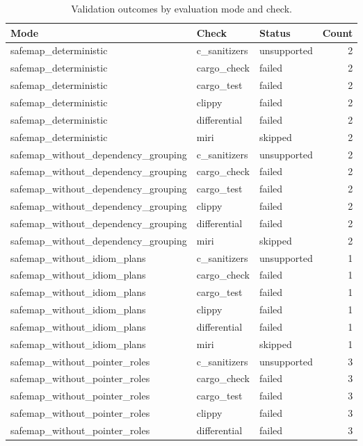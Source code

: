 \begin{table}[t]
\centering
\caption{Validation outcomes by evaluation mode and check.}
\label{tab:safemap-validation-statuses}
\begin{tabular}{lllr}
\hline
Mode & Check & Status & Count \\
\hline
safemap\_deterministic & c\_sanitizers & unsupported & 2 \\
safemap\_deterministic & cargo\_check & failed & 2 \\
safemap\_deterministic & cargo\_test & failed & 2 \\
safemap\_deterministic & clippy & failed & 2 \\
safemap\_deterministic & differential & failed & 2 \\
safemap\_deterministic & miri & skipped & 2 \\
safemap\_without\_dependency\_grouping & c\_sanitizers & unsupported & 2 \\
safemap\_without\_dependency\_grouping & cargo\_check & failed & 2 \\
safemap\_without\_dependency\_grouping & cargo\_test & failed & 2 \\
safemap\_without\_dependency\_grouping & clippy & failed & 2 \\
safemap\_without\_dependency\_grouping & differential & failed & 2 \\
safemap\_without\_dependency\_grouping & miri & skipped & 2 \\
safemap\_without\_idiom\_plans & c\_sanitizers & unsupported & 1 \\
safemap\_without\_idiom\_plans & cargo\_check & failed & 1 \\
safemap\_without\_idiom\_plans & cargo\_test & failed & 1 \\
safemap\_without\_idiom\_plans & clippy & failed & 1 \\
safemap\_without\_idiom\_plans & differential & failed & 1 \\
safemap\_without\_idiom\_plans & miri & skipped & 1 \\
safemap\_without\_pointer\_roles & c\_sanitizers & unsupported & 3 \\
safemap\_without\_pointer\_roles & cargo\_check & failed & 3 \\
safemap\_without\_pointer\_roles & cargo\_test & failed & 3 \\
safemap\_without\_pointer\_roles & clippy & failed & 3 \\
safemap\_without\_pointer\_roles & differential & failed & 3 \\

\end{tabular}
\end{table}
